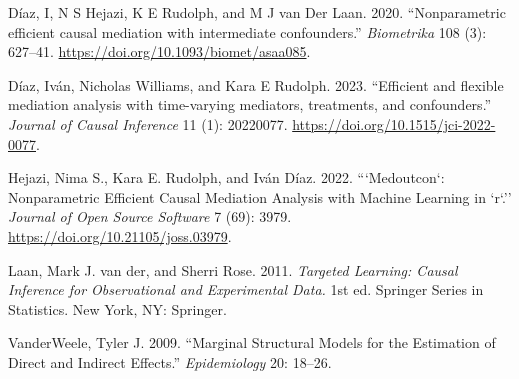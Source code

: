 \documentclass[
]{book}
\newlength{\cslhangindent}
\newenvironment{CSLReferences}[2] %
 {\begin{list}{}{%
  \setlength{\itemindent}{0pt}
  \setlength{\leftmargin}{0pt}
  \setlength{\parsep}{0pt}
  \ifodd #1
   \setlength{\leftmargin}{\cslhangindent}
   \setlength{\itemindent}{-1\cslhangindent}
  \fi
  \setlength{\itemsep}{#2\baselineskip}}}
 {\end{list}}
\begin{document}
\label{refs}
\begin{CSLReferences}{1}{0}
Díaz, I, N S Hejazi, K E Rudolph, and M J van Der Laan. 2020. {``{Nonparametric efficient causal mediation with intermediate confounders}.''} \emph{Biometrika} 108 (3): 627--41. \url{https://doi.org/10.1093/biomet/asaa085}.

Díaz, Iván, Nicholas Williams, and Kara E Rudolph. 2023. {``{Efficient and flexible mediation analysis with time-varying mediators, treatments, and confounders}.''} \emph{Journal of Causal Inference} 11 (1): 20220077. \url{https://doi.org/10.1515/jci-2022-0077}.

Hejazi, Nima S., Kara E. Rudolph, and Iván Díaz. 2022. {```Medoutcon`: Nonparametric Efficient Causal Mediation Analysis with Machine Learning in `r`.''} \emph{Journal of Open Source Software} 7 (69): 3979. \url{https://doi.org/10.21105/joss.03979}.

Laan, Mark J. van der, and Sherri Rose. 2011. \emph{Targeted Learning: Causal Inference for Observational and Experimental Data.} 1st ed. Springer Series in Statistics. New York, NY: Springer.

VanderWeele, Tyler J. 2009. {``Marginal Structural Models for the Estimation of Direct and Indirect Effects.''} \emph{Epidemiology} 20: 18--26.

\end{CSLReferences}
\end{document}
